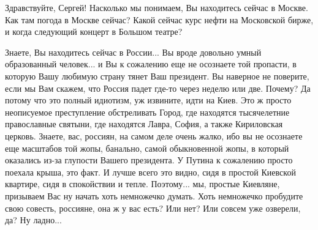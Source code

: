  
 
 
 
 

Здравствуйте, Сергей! Насколько мы понимаем, Вы находитесь сейчас в Москве.
Как там погода в Москве сейчас? Какой сейчас курс нефти на Московской бирже,
и когда следующий концерт в Большом театре?

Знаете, Вы находитесь сейчас в России... Вы вроде довольно умный образованный
человек...  и Вы к сожалению еще не осознаете той пропасти, в которую Вашу
любимую страну тянет Ваш президент. Вы наверное не поверите, если мы Вам
скажем, что Россия падет где-то через неделю или две. Почему?  Да потому что
это полный идиотизм, уж извините, идти на Киев. Это ж просто неописуемое
преступление обстреливать Город, где находятся тысячелетние православные
святыни, где находятся Лавра, София, а также Кириловская церковь. Знаете, вас,
россиян, на самом деле очень жалко, ибо вы не осознаете еще масштабов той жопы, банально,
самой обыкновенной жопы,
в который оказались из-за глупости Вашего президента. У Путина к сожалению
просто поехала крыша, это факт. И лучше всего это видно, сидя в простой
Киевской квартире, сидя в спокойствии и тепле. Поэтому... мы, простые Киевляне,
призываем Вас ну начать хоть немножечко думать. Хоть немножечко пробудите свою
совесть, россияне, она ж у вас есть? Или нет? Или совсем уже озверели, да? Ну
ладно... 

